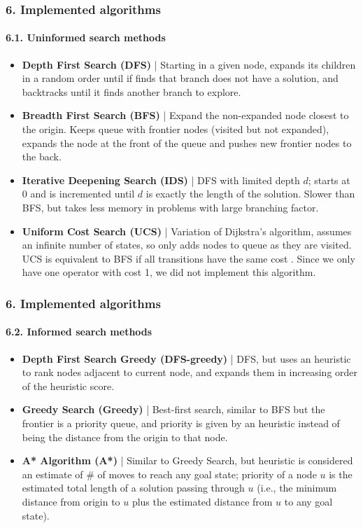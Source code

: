 \documentclass{beamer}
\begin{document}
\begin{frame}
\frametitle{6. Implemented algorithms}
\framesubtitle{6.1. Uninformed search methods}

\begin{itemize}
  \item \textbf{Depth First Search (DFS)} | Starting in a given node, expands its children in a random order until if finds that branch does not have a solution, and backtracks until it finds another branch to explore. 
  
  \item \textbf{Breadth First Search (BFS)} |  Expand the non-expanded node closest to the origin. Keeps queue with frontier nodes (visited but not expanded), expands the node at the front of the queue and pushes new frontier nodes to the back.
  
  \item \textbf{Iterative Deepening Search (IDS)} | DFS with limited depth $d$; starts at $0$ and is incremented until $d$ is exactly the length of the solution. Slower than BFS, but takes less memory in problems with large branching factor.
  
  \item \textbf{Uniform Cost Search (UCS)} | Variation of Dijkstra's algorithm, assumes an infinite number of states, so only adds nodes to queue as they are visited.
  UCS is equivalent to BFS if all transitions have the same cost \cite{javatpoint-uninformed}.
  Since we only have one operator with cost 1, we did not implement this algorithm.
\end{itemize}
\end{frame}

\begin{frame}
\frametitle{6. Implemented algorithms}
\framesubtitle{6.2. Informed search methods}

\begin{itemize}  
  \item \textbf{Depth First Search Greedy (DFS-greedy)} | DFS, but uses an heuristic to rank nodes adjacent to current node, and expands them in increasing order of the heuristic score.
  \item \textbf{Greedy Search (Greedy)} | Best-first search, similar to BFS but the frontier is a priority queue, and priority is given by an heuristic instead of being the distance from the origin to that node.
  \item \textbf{A* Algorithm (A*)} | Similar to Greedy Search, but heuristic is considered an estimate of \# of moves to reach any goal state; priority of a node $u$ is the estimated total length of a solution passing through $u$ (i.e., the minimum distance from origin to $u$ plus the estimated distance from $u$ to any goal state).
\end{itemize}
\end{frame}
\end{document}
